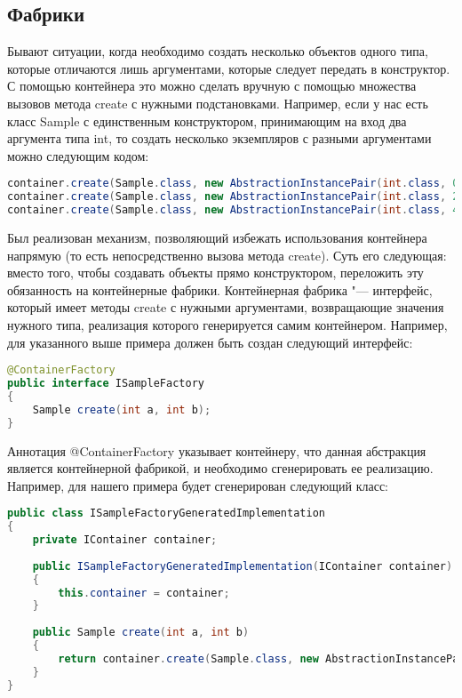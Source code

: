 \subsection{Фабрики}

Бывают ситуации, когда необходимо создать несколько объектов одного типа, которые отличаются лишь аргументами, которые следует передать в конструктор.
С помощью контейнера это можно сделать вручную с помощью множества вызовов метода create с нужными подстановками. Например, если у нас есть класс Sample с единственным
конструктором, принимающим на вход два аргумента типа int, то создать несколько экземпляров с разными аргументами можно следующим кодом:

\begin{lstlisting}[language=Java,caption={Пример создания множества экземпляров с разными параметрами}]
container.create(Sample.class, new AbstractionInstancePair(int.class, 0), new AbstractionInstancePair(int.class, 1));
container.create(Sample.class, new AbstractionInstancePair(int.class, 2), new AbstractionInstancePair(int.class, 3));
container.create(Sample.class, new AbstractionInstancePair(int.class, 4), new AbstractionInstancePair(int.class, 5));
\end{lstlisting}

Был реализован механизм, позволяющий избежать использования контейнера напрямую (то есть непосредственно вызова метода create).
Суть его следующая: вместо того, чтобы создавать объекты прямо конструктором, переложить эту обязанность на контейнерные фабрики. Контейнерная фабрика "--- интерфейс, который имеет методы
create с нужными аргументами, возвращающие значения нужного типа, реализация которого генерируется самим контейнером. 
Например, для указанного выше примера должен быть создан следующий интерфейс:

\begin{lstlisting}[language=Java,caption={Пример фабрики}]
@ContainerFactory
public interface ISampleFactory
{
	Sample create(int a, int b);
}
\end{lstlisting}

Аннотация @ContainerFactory указывает контейнеру, что данная абстракция является контейнерной фабрикой, и необходимо сгенерировать ее реализацию. Например, для нашего примера будет
сгенерирован следующий класс:

\begin{lstlisting}[language=Java,caption={Реализация интерфейса ISampleFactory, которая будет сгенерирована контейнером}]
public class ISampleFactoryGeneratedImplementation
{
	private IContainer container;
	
	public ISampleFactoryGeneratedImplementation(IContainer container)
	{
		this.container = container;
	}
	
	public Sample create(int a, int b)
	{
		return container.create(Sample.class, new AbstractionInstancePair[]{new AbstractionInstancePair(int.class, a), new AbstractionInstancePair(int.class, b)});
	}
}
\end{lstlisting}


